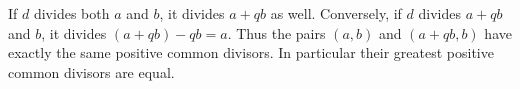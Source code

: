 If $d$ divides both $a$ and $b$, it divides $a+qb$ as well. Conversely, if $d$ divides $a+qb$ and $b$, it divides $(a+qb)-qb=a$. Thus the pairs $(a,b)$ and $(a+qb,b)$ have exactly the same positive common divisors. In particular their greatest positive common divisors are equal.
